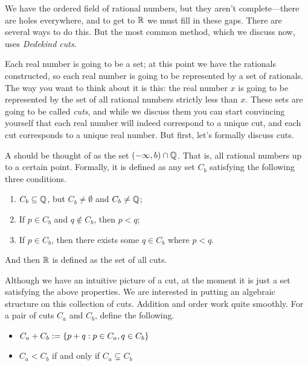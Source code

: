 \documentclass[11pt,twoside=off,numbers=noenddot]{scrbook}
\begin{document}
\begin{proofidea}
    We have the ordered field of rational numbers, but they aren't complete—there are holes everywhere, and to get to $\mathbb R$ we must fill in these gaps. There are several ways to do this. But the most common method, which we discuss now, uses \textit{Dedekind cuts}.

    Each real number is going to be a set; at this point we have the rationals constructed, so each real number is going to be represented by a set of rationals. The way you want to think about it is this: the real number $x$ is going to be represented by the set of all rational numbers strictly less than $x$. These sets are going to be called \textit{cuts}, and while we discuss them you can start convincing yourself that each real number will indeed correspond to a unique cut, and each cut corresponds to a unique real number. But first, let's formally discuss cuts.

    \begin{definition}
        A  should be thought of as the set $(-\infty, b) \cap \mathbb Q$. That is, all rational numbers up to a certain point. Formally, it is defined as any set $C_b$ satisfying the following three conditions.
        \begin{enumerate}
            \item $C_b \subseteq \mathbb Q$, but $C_b \neq \emptyset$ and $C_b \neq \mathbb Q$;
            \item If $p \in C_b$ and $q \notin C_b$, then $p < q$;
            \item If $p \in C_b$, then there exists some $q \in C_b$ where $p < q$.
        \end{enumerate}
    \end{definition}

    And then $\mathbb R$ is defined as the set of all cuts.

    Although we have an intuitive picture of a cut, at the moment it is just a set satisfying the above properties. We are interested in putting an algebraic structure on this collection of cuts. Addition and order work quite smoothly. For a pair of cuts $C_a$ and $C_b$, define the following.
    \begin{itemize}
        \item $C_a + C_b := \{ p + q : p \in C_a, q \in C_b \}$
        \item $C_a < C_b$ if and only if $C_a \subsetneq C_b$
    \end{itemize}


\end{proofidea}
\end{document}
